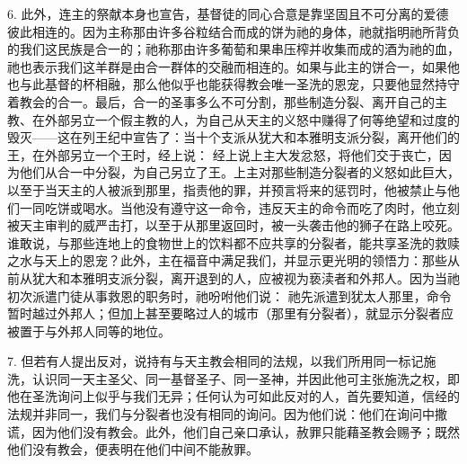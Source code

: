 6. 此外，连主的祭献本身也宣告，基督徒的同心合意是靠坚固且不可分离的爱德彼此相连的。因为主称那由许多谷粒结合而成的饼为祂的身体，祂就指明祂所背负的我们这民族是合一的；祂称那由许多葡萄和果串压榨并收集而成的酒为祂的血，祂也表示我们这羊群是由合一群体的交融而相连的。如果与此主的饼合一，如果他也与此基督的杯相融，那么他似乎也能获得教会唯一圣洗的恩宠，只要他显然持守着教会的合一。最后，合一的圣事多么不可分割，那些制造分裂、离开自己的主教、在外部另立一个假主教的人，为自己从天主的义怒中赚得了何等绝望和过度的毁灭——这在列王纪中宣告了：当十个支派从犹大和本雅明支派分裂，离开他们的王，在外部另立一个王时，经上说： 经上说上主大发忿怒，将他们交于丧亡，因为他们从合一中分裂，为自己另立了王。上主对那些制造分裂者的义怒如此巨大，以至于当天主的人被派到那里，指责他的罪，并预言将来的惩罚时，他被禁止与他们一同吃饼或喝水。当他没有遵守这一命令，违反天主的命令而吃了肉时，他立刻被天主审判的威严击打，以至于从那里返回时，被一头袭击他的狮子在路上咬死。谁敢说，与那些连地上的食物世上的饮料都不应共享的分裂者，能共享圣洗的救赎之水与天上的恩宠？此外，主在福音中满足我们，并显示更光明的领悟力：那些从前从犹大和本雅明支派分裂，离开退到的人，应被视为亵渎者和外邦人。因为当祂初次派遣门徒从事救恩的职务时，祂吩咐他们说： 祂先派遣到犹太人那里，命令暂时越过外邦人；但加上甚至要略过人的城市（那里有分裂者），就显示分裂者应被置于与外邦人同等的地位。\par

7. 但若有人提出反对，说持有与天主教会相同的法规，以我们所用同一标记施洗，认识同一天主圣父、同一基督圣子、同一圣神，并因此他可主张施洗之权，即他在圣洗询问上似乎与我们无异；任何认为可如此反对的人，首先要知道，信经的法规并非同一，我们与分裂者也没有相同的询问。因为他们说：他们在询问中撒谎，因为他们没有教会。此外，他们自己亲口承认，赦罪只能藉圣教会赐予；既然他们没有教会，便表明在他们中间不能赦罪。\par

